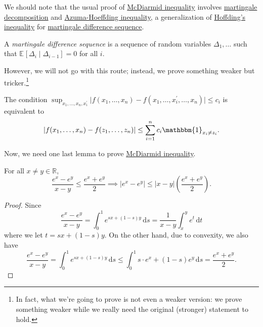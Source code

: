 We should note that the usual proof of \hyperref[thm:McDiarmid-inequality]{McDiarmid inequality} involves \href{https://en.wikipedia.org/wiki/Doob_decomposition_theorem}{martingale decomposition} and \href{https://en.wikipedia.org/wiki/Azuma%27s_inequality}{Azuma-Hoeffding inequality}, a generalization of \hyperref[thm:Hoeffding-inequality]{Hoffding's inequality} for \hyperref[def:martingale-difference-sequence]{martingale difference sequence}.

\begin{definition}\label{def:martingale-difference-sequence}
  A \emph{martingale difference sequence} is a sequence of random variables \(\Delta _1, \dots \) such that \(\mathbb{E}_{}\left[\Delta _i \mid \Delta _{i-1} \right] = 0\) for all \(i\).
\end{definition}

However, we will not go with this route; instead, we prove something weaker but tricker.\footnote{In fact, what we're going to prove is not even a weaker version: we prove something weaker while we really need the original (stronger) statement to hold.}

\begin{note}
  The condition \(\sup _{x_1, \dots , x_n, x_i^{\prime} }\vert f(x_1, \dots , x_n) - f(x_1, \dots , x_i^{\prime} , \dots , x_n) \vert \leq c_i\) is equivalent to
  \[
    \vert f(x_1, \dots , x_n) - f(z_1, \dots , z_n) \vert \leq \sum_{i=1}^{n} c_i \mathbbm{1}_{x_i \neq z_i}.
  \]
\end{note}

Now, we need one last lemma to prove \hyperref[thm:McDiarmid-inequality]{McDiarmid inequality}.

\begin{lemma}\label{lma:lec5}
  For all \(x \neq y \in \mathbb{R} \),
  \[
    \frac{e^x - e^y}{x-y} \leq \frac{e^x + e^y}{2} \implies \vert e^x - e^y \vert \leq \vert x - y \vert \left( \frac{e^x + e^y}{2} \right).
  \]
\end{lemma}
\begin{proof}
  Since
  \[
    \frac{e^x - e^y}{x-y}
    = \int_{0}^{1} e^{s x + (1 - s)y} \,\mathrm{d}s
    = \frac{1}{x - y} \int_{x}^{y} e^t \,\mathrm{d}t
  \]
  where we let \(t = sx + (1 - s)y\). On the other hand, due to convexity, we also have
  \[
    \frac{e^x - e^y}{x-y}
    = \int_{0}^{1} e^{s x + (1 - s)y} \,\mathrm{d}s
    \leq \int_{0}^{1} s\cdot e^x + (1 - s)e^y \,\mathrm{d}s
    = \frac{e^x + e^y}{2}.
  \]
\end{proof}


